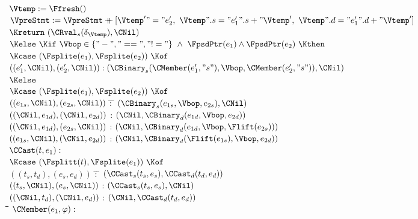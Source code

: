 \begin{docpart}
\begin{figure}[htbp]
\begin{center}
{{\begin{pseudocode}
              $\Vtemp := \Ffresh()$ \\
              $\VpreStmt := \VpreStmt \append
              [\Vtemp'" = "e'_2,\
               {\Vtemp}".s = "e'_1".s + "{\Vtemp'},\
               {\Vtemp}".d = "e'_1".d + "{\Vtemp'}]$ \\
              $\Kreturn\ (\CRval_s(\delta_{\Vtemp}), \CNil)$ \-\\
            $\Kelse\ 
             \Kif\ \Vbop \in \{"-","==","!="\} \ \land \ 
             {\FpsdPtr}(e_1) \land {\FpsdPtr}(e_2)\ \Kthen\ $ \+\\
              $\Kcase\ (\Fsplite(e_1), \Fsplite(e_2))\ \Kof$ \+\\
                 $((e'_1, \CNil), (e'_2, \CNil)) : 
                  (\CBinary_s(\CMember(e'_1, "s"), \Vbop,
                               \CMember(e'_2, "s")), \CNil)$ \-\-\\
            $\Kelse$ \+\\
              $\Kcase\ (\Fsplite(e_1), \Fsplite(e_2))\ \Kof$ \+\\
                $((e_{1s}, \CNil), (e_{2s}, \CNil))$ \= : \=
                  $(\CBinary_s(e_{1s}, \Vbop, e_{2s}), \CNil)$ \\
                $((\CNil, e_{1d}), (\CNil, e_{2d}))$ \> : \> 
                  $(\CNil, \CBinary_d(e_{1d}, \Vbop, e_{2d}))$ \\
                $((\CNil, e_{1d}), (e_{2s}, \CNil))$ \> : \>
                  $(\CNil, \CBinary_d(e_{1d}, \Vbop, \Flift(e_{2s})))$ \\
                $((e_{1s}, \CNil), (\CNil, e_{2d}))$ \> : \> 
                  $(\CNil, \CBinary_d(\Flift(e_{1s}), \Vbop, e_{2d}))$ 
                \-\-\-\\[1ex]
          $\CCast(t,e_1) : $ \+\\
            $\Kcase\ (\Fsplitt(t), \Fsplite(e_1))\ \Kof$ \+\\
              $((t_s, t_d), (e_s, e_d))$ \quad \= : \= 
                 $(\CCast_s(t_s, e_s), \CCast_d(t_d, e_d))$ \\
              $((t_s, \CNil), (e_s, \CNil))$ \>:\> 
                $(\CCast_s(t_s,e_s), \CNil)$ \\
              $((\CNil, t_d), (\CNil, e_d))$ \>:\> 
                $(\CNil, \CCast_d(t_d,e_d))$
                \-\-\\[1ex]
\quad\=\quad\=\quad\=\quad\=\quad\=\quad\=\quad\=\quad\=\quad\=\quad\=\kill
          $\CMember(e_1,\varphi) : $ \+\\

\end{pseudocode}}}
\end{center}
\end{figure}
\end{docpart}
